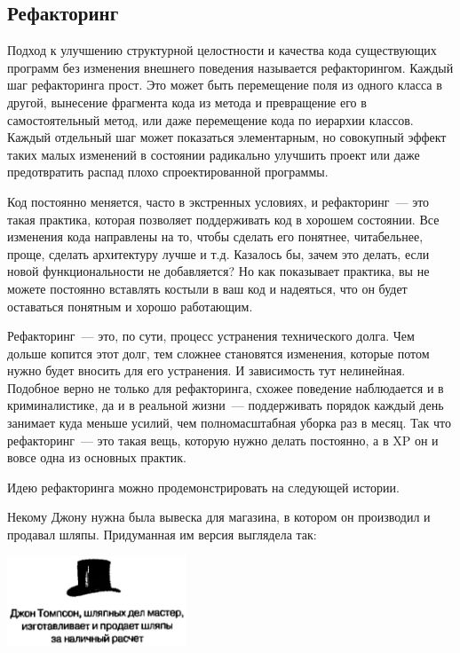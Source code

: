 \documentclass{../../text-style}
\begin{document}
\subsection{Рефакторинг}

Подход к улучшению структурной целостности и качества кода существующих программ без изменения внешнего поведения называется рефакторингом. Каждый шаг рефакторинга прост. Это может быть перемещение поля из одного класса в другой, вынесение фрагмента кода из метода и превращение его в самостоятельный метод, или даже перемещение кода по иерархии классов. Каждый отдельный шаг может показаться элементарным, но совокупный эффект таких малых изменений в состоянии радикально улучшить проект или даже предотвратить распад плохо спроектированной программы. 

Код постоянно меняется, часто в экстренных условиях, и рефакторинг~--- это такая практика, которая позволяет поддерживать код в хорошем состоянии. Все изменения кода направлены на то, чтобы сделать его понятнее, читабельнее, проще, сделать архитектуру лучше и т.д. Казалось бы, зачем это делать, если новой функциональности не добавляется? Но как показывает практика, вы не можете постоянно вставлять костыли в ваш код и надеяться, что он будет оставаться понятным и хорошо работающим.

Рефакторинг~--- это, по сути, процесс устранения технического долга. Чем дольше копится этот долг, тем сложнее становятся изменения, которые потом нужно будет вносить для его устранения. И зависимость тут нелинейная. Подобное верно не только для рефакторинга, схожее поведение наблюдается и в криминалистике, да и в реальной жизни~--- поддерживать порядок каждый день занимает куда меньше усилий, чем полномасштабная уборка раз в месяц. Так что рефакторинг~--- это такая вещь, которую нужно делать постоянно, а в XP он и вовсе одна из основных практик.

Идею рефакторинга можно продемонстрировать на следующей истории.

Некому Джону нужна была вывеска для магазина, в котором он производил и продавал шляпы. Придуманная им версия выглядела так:

\begin{center}
    \includegraphics[width=0.4\textwidth]{hatsRefactoringInitial.png}
\end{center}
\end{document}
